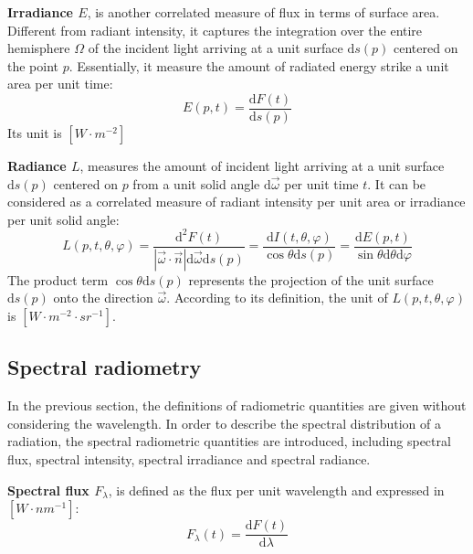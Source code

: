 \textbf{Irradiance $E$}, is another correlated measure of flux in terms of surface area.
Different from radiant intensity, it captures the integration over the entire hemisphere $\Omega$ of the incident light arriving at a unit surface $\mathrm{d}s(p)$ centered on the point $p$.
Essentially, it measure the amount of radiated energy strike a unit area per unit time:
\begin{equation}
    E(p, t) = \frac{\mathrm{d}F(t)}{\mathrm{d}s(p)}
\end{equation}
Its unit is $[W \cdot m^{-2}]$


\textbf{Radiance $L$}, measures the amount of incident light arriving at a unit surface $\mathrm{d}s(p)$ centered on $p$ from a unit solid angle $\mathrm{d}\overrightarrow{\omega}$ per unit time $t$.
It can be considered as a correlated measure of radiant intensity per unit area or irradiance per unit solid angle:
\begin{equation}
    \label{eq_irradiance_radiance_intensity}
    L(p, t, \theta, \varphi) = \frac{\mathrm{d}^2 F(t)}{\left| \overrightarrow{\omega} \cdot \overrightarrow{n} \right| \mathrm{d} \overrightarrow{\omega} \mathrm{d}s(p)}%
    = \frac{\mathrm{d}I(t, \theta, \varphi)}{\cos \theta \mathrm{d}s(p)}%
    = \frac{\mathrm{d} E(p, t)}{\sin \theta  \mathrm{d}\theta \mathrm{d} \varphi}%
\end{equation}
The product term $\cos \theta \mathrm{d}s(p)$ represents the projection of the unit surface $\mathrm{d}s(p)$ onto the direction $\overrightarrow{\omega}$.
According to its definition, the unit of $L(p, t, \theta, \varphi)$ is $[W \cdot m^{-2} \cdot {sr}^{-1}]$.

\subsection{Spectral radiometry}

In the previous section, the definitions of radiometric quantities are given without considering the wavelength.
In order to describe the spectral distribution of a radiation, the spectral radiometric quantities are introduced, including spectral flux, spectral intensity, spectral irradiance and spectral radiance.

\textbf{Spectral flux $F_\lambda$}, is defined as the flux per unit wavelength and expressed in $[W \cdot {nm}^{-1}]$:
\begin{equation}
    F_\lambda(t) = \frac{\mathrm{d}F(t)}{\mathrm{d}\lambda}
\end{equation}

